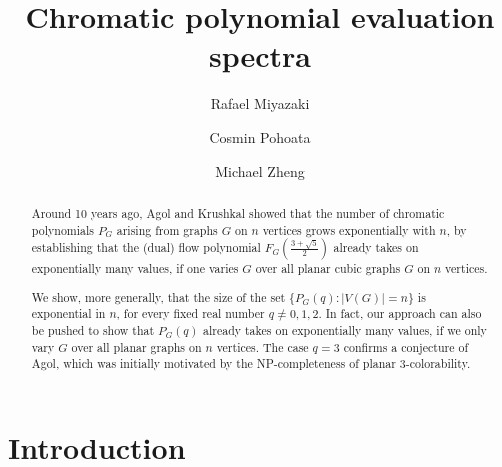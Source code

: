 \documentclass[A4paper,reqno,oneside,12pt]{amsart}
\theoremstyle{plain}
\theoremstyle{definition}
\begin{document}

\title{Chromatic polynomial evaluation spectra}

\author[Rafael Miyazaki]{Rafael Miyazaki\:}
\author[Cosmin Pohoata]{Cosmin Pohoata\:}
\author[Michael Zheng]{Michael Zheng\:}
\address{Department of Mathematics, Emory University, Atlanta, GA, 30322, USA}


\maketitle

\medskip
\begin{abstract}
Around 10 years ago, Agol and Krushkal showed that the number of chromatic polynomials $P_{G}$ arising from graphs $G$ on $n$ vertices grows exponentially with $n$, by establishing that the (dual) flow polynomial $F_{G}\left(\frac{3+\sqrt{5}}{2}\right)$ already takes on exponentially many values, if one varies $G$ over all planar cubic graphs $G$ on $n$ vertices. 

We show, more generally, that the size of the set $\{P_G(q): |V(G)|=n\}$ is exponential in $n$, for every fixed real number $q \neq 0,1,2$. In fact, our approach can also be pushed to show that $P_{G}(q)$ already takes on exponentially many values, if we only vary $G$ over all planar graphs on $n$ vertices. The case $q=3$ confirms a conjecture of Agol, which was initially motivated by the {\sf NP}-completeness of planar $3$-colorability. 
\end{abstract}

\section{Introduction} \label{sec:intro}
\end{document}
